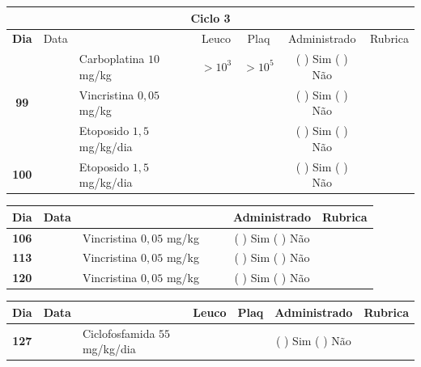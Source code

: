 \documentclass[11pt,a4paper,oldfontcommands]{memoir}
\begin{document}
\begin{center}
\begin{table}[H] \small
\begin{tabular}{p{1cm}c|p{4.8cm}|p{1.8cm}p{1.8cm}|c|c}
	\hline
	\multicolumn{7}{c}{Ciclo 3} \\
	\hline
	\multicolumn{1}{c|}{\multirow{1}{*}{\textbf{Dia}}}&{Data}&{}&\multicolumn{1}{c|}{Leuco}&\multicolumn{1}{c|}{Plaq}&{Administrado}&{Rubrica} \\
    \hline
    \multicolumn{1}{c|}{\multirow{3}{*}{\textbf{99}}}&\multirow{2}{*}{}&{Carboplatina \(10\) mg/kg}&\multicolumn{1}{c|}{\(>10^3\)}&\multicolumn{1}{c|}{\(>10^5\)}&{(  ) Sim (  ) Não}&\\
    \cline{4-5}
    \multicolumn{1}{c|}{}&&{Vincristina \(0,05\) mg/kg}&\multicolumn{1}{c|}{}&&{(  ) Sim (  ) Não}&\\
    \cline{4-5}
    \multicolumn{1}{c|}{}&\multirow{1}{*}{}&{Etoposido \(1,5\) mg/kg/dia}&{}&&{(  ) Sim (  ) Não}&\\
    \cline{1-3}\cline{6-6}
    \multicolumn{1}{c|}{\textbf{100}}&\multirow{1}{*}{}&{Etoposido \(1,5\) mg/kg/dia}&{}&&{(  ) Sim (  ) Não}&\\
    \hline
\end{tabular}
\end{table}
\begin{table}[H] \small
\begin{tabular}{p{1cm}c|p{4.8cm}|p{1.8cm}p{1.8cm}|c|c}
	\hline
	\multicolumn{1}{c|}{\multirow{1}{*}{\textbf{Dia}}}&{Data}&{}&{}&&{Administrado}&{Rubrica} \\
    \hline
    \multicolumn{1}{c|}{\textbf{106}}&&{Vincristina \(0,05\) mg/kg}&\multicolumn{1}{c}{}&&{(  ) Sim (  ) Não}&\\
    \hline
    \multicolumn{1}{c|}{\textbf{113}}&&{Vincristina \(0,05\) mg/kg}&\multicolumn{1}{c}{}&&{(  ) Sim (  ) Não}&\\
    \hline
    \multicolumn{1}{c|}{\textbf{120}}&&{Vincristina \(0,05\) mg/kg}&\multicolumn{1}{c}{}&&{(  ) Sim (  ) Não}&\\
    \hline
\end{tabular}
\end{table}
\begin{table}[H] \small
\begin{tabular}{p{1cm}c|p{4.8cm}|p{1.8cm}p{1.8cm}|c|c}
	\hline
	\multicolumn{1}{c|}{\multirow{1}{*}{\textbf{Dia}}}&{Data}&{}&\multicolumn{1}{c|}{Leuco}&\multicolumn{1}{c|}{Plaq}&{Administrado}&{Rubrica} \\
    \hline
    \multicolumn{1}{c|}{\multirow{3}{*}{\textbf{127}}}&&{Ciclofosfamida \(55\) mg/kg/dia}&\multicolumn{1}{c|}{}&&{(  ) Sim (  ) Não}&\\

\end{tabular}
\end{table}
\end{center}
\end{document}
